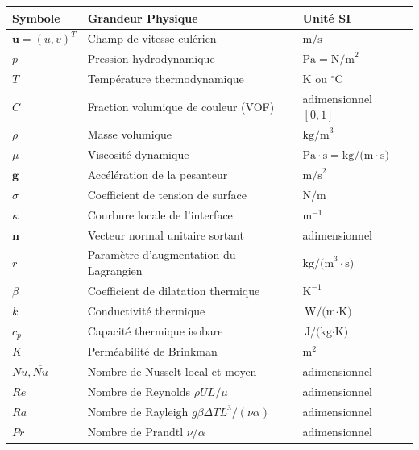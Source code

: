 \documentclass[
  french,
]{article}
\newcounter{none} %
\begin{document}
{\def\LTcaptype{none} %
\begin{longtable}[]{@{}
  >{\raggedright\arraybackslash}p{}
  >{\raggedright\arraybackslash}p{}
  >{\raggedright\arraybackslash}p{}@{}}
\toprule\noalign{}
\begin{minipage}[b]{\linewidth}\raggedright
Symbole
\end{minipage} & \begin{minipage}[b]{\linewidth}\raggedright
Grandeur Physique
\end{minipage} & \begin{minipage}[b]{\linewidth}\raggedright
Unité SI
\end{minipage} \\
\midrule\noalign{}
\endhead
\bottomrule\noalign{}
\endlastfoot
\(\mathbf{u} = (u, v)^T\) & Champ de vitesse eulérien &
\(\text{m/s}\) \\
\(p\) & Pression hydrodynamique & \(\text{Pa} = \text{N/m}^2\) \\
\(T\) & Température thermodynamique & \(\text{K}\) ou
\(^{\circ}\text{C}\) \\
\(C\) & Fraction volumique de couleur (VOF) & adimensionnel
\([0, 1]\) \\
\(\rho\) & Masse volumique & \(\text{kg/m}^3\) \\
\(\mu\) & Viscosité dynamique &
\(\text{Pa}\cdot\text{s} = \text{kg/(m}\cdot\text{s)}\) \\
\(\mathbf{g}\) & Accélération de la pesanteur & \(\text{m/s}^2\) \\
\(\sigma\) & Coefficient de tension de surface & \(\text{N/m}\) \\
\(\kappa\) & Courbure locale de l'interface & \(\text{m}^{-1}\) \\
\(\mathbf{n}\) & Vecteur normal unitaire sortant & adimensionnel \\
\(r\) & Paramètre d'augmentation du Lagrangien &
\(\text{kg/(m}^3\cdot\text{s)}\) \\
\(\beta\) & Coefficient de dilatation thermique & \(\text{K}^{-1}\) \\
\(k\) & Conductivité thermique & \(\text{W/(m}\cdot\text{K)}\) \\
\(c_p\) & Capacité thermique isobare & \(\text{J/(kg}\cdot\text{K)}\) \\
\(K\) & Perméabilité de Brinkman & \(\text{m}^2\) \\
\(Nu, \overline{Nu}\) & Nombre de Nusselt local et moyen &
adimensionnel \\
\(Re\) & Nombre de Reynolds \(\rho U L / \mu\) & adimensionnel \\
\(Ra\) & Nombre de Rayleigh \(g \beta \Delta T L^3 / (\nu \alpha)\) &
adimensionnel \\
\(Pr\) & Nombre de Prandtl \(\nu / \alpha\) & adimensionnel \\
\end{longtable}
}
\end{document}
